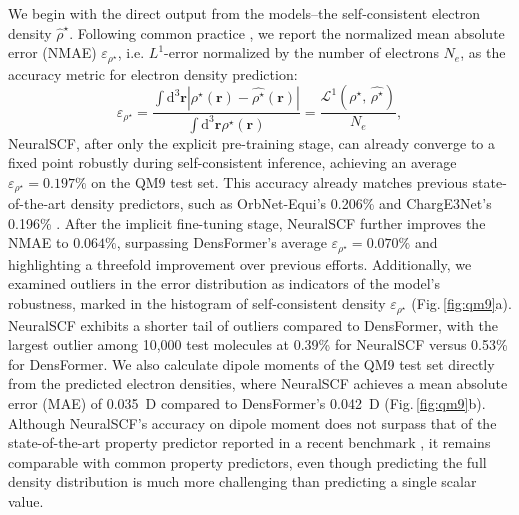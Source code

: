 \documentclass[%
reprint,
superscriptaddress,
bibnotes,
amsmath,amssymb,
aps,
floatfix, %
]{revtex4-2}
\begin{document}
We begin with the direct output from the models--the self-consistent electron density $\hat{\rho}^\star$. Following common practice \cite{fabrizio2019electron,rackers2023,grisafi2019,grisafi2023,jorgensen2022}, we report the normalized mean absolute error (NMAE) $\varepsilon_{\rho^\star}$, i.e. $L^1$-error normalized by the number of electrons $N_e$, as the accuracy metric for electron density prediction:
\begin{equation}
  \varepsilon_{\rho^\star} =\frac{\int \mathrm{d}^3\bm{r} \left|{\rho^\star}(\bm{r})-\hat{{\rho^\star}}(\bm{r}) \right|}{\int \mathrm{d}^3\bm{r} {\rho^\star}(\bm{r})} = \frac{\mathcal{L}^1 ({\rho^\star},\,\hat{{\rho^\star}})}{N_e},
\end{equation}
NeuralSCF, after only the explicit pre-training stage, can already converge to a fixed point robustly during self-consistent inference, achieving an average $\varepsilon_{\rho^\star} = 0.197\%$ on the QM9 test set. This accuracy already matches previous state-of-the-art density predictors, such as OrbNet-Equi's 0.206\% \cite{jorgensen2022} and ChargE3Net's 0.196\% \cite{koker2023higherorder}. After the implicit fine-tuning stage, NeuralSCF further improves the NMAE to $0.064\%$, surpassing DensFormer's average $\varepsilon_{\rho^\star} = 0.070\%$ and highlighting a threefold improvement over previous efforts. Additionally, we examined outliers in the error distribution as indicators of the model's robustness, marked in the histogram of self-consistent density $\varepsilon_{\rho^\star}$ (Fig.\,\ref{fig:qm9}a). NeuralSCF exhibits a shorter tail of outliers compared to DensFormer, with the largest outlier among 10,000 test molecules at 0.39\% for NeuralSCF versus 0.53\% for DensFormer. We also calculate dipole moments of the QM9 test set directly from the predicted electron densities, where NeuralSCF achieves a mean absolute error (MAE) of \SI{0.035}{D} compared to DensFormer's \SI{0.042}{D} (Fig.\,\ref{fig:qm9}b). Although NeuralSCF's accuracy on dipole moment does not surpass that of the state-of-the-art property predictor reported in a recent benchmark \cite{liao2023equiformerv2}, it remains comparable with common property predictors, even though predicting the full density distribution is much more challenging than predicting a single scalar value.
\end{document}

